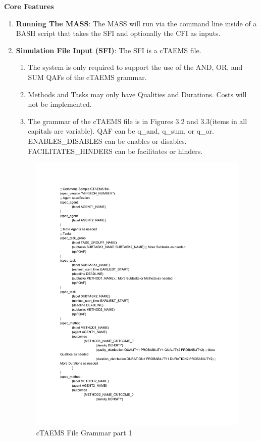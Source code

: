 \begin{center} \textbf{Core Features} \end{center}


\begin{enumerate}

  \item\textbf{Running The MASS}: The MASS will run via the command line inside of a BASH script that takes the SFI and optionally the CFI as inputs.
  
  \item\textbf{Simulation File Input (SFI)}: The SFI is a cTAEMS file.
    \begin{enumerate}
    \item The system is only required to support the use of the AND, OR, and SUM QAFs of the cTAEMS grammar.
    \item Methods and Tasks may only have Qualities and Durations. Costs will not be implemented.
    \item The grammar of the cTAEMS file is in Figures 3.2 and 3.3(items in all capitals are variable).
    	\subitem QAF can be q\_and, q\_sum, or q\_or.
    	\subitem ENABLES\_DISABLES can be enables or disables.
    	\subitem FACILITATES\_HINDERS can be facilitates or hinders.
  \end{enumerate}
  
\begin{figure}[H]
\centering
\includegraphics[page=1, width=4.6in]{figs/cTAEMS.pdf}
\caption{cTAEMS File Grammar part 1}
\label{fig:cTAEMS}
\end{figure}


\end{enumerate}
